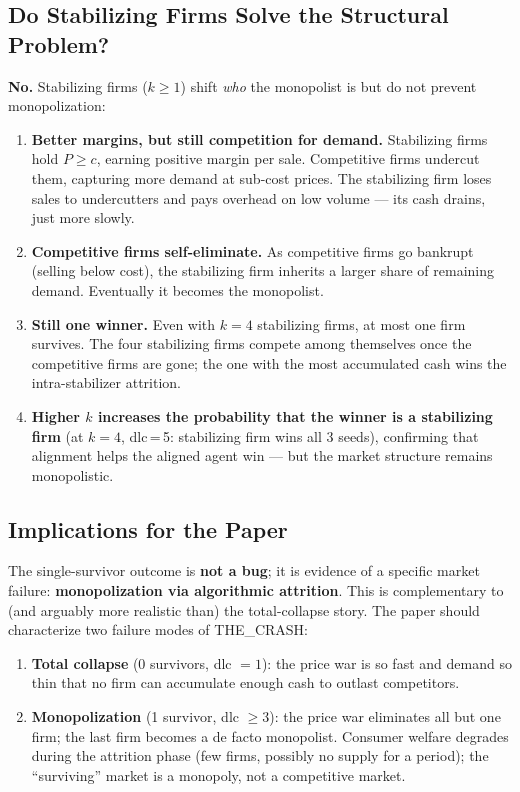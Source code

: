 \documentclass{article}
\begin{document}
\subsection{Do Stabilizing Firms Solve the Structural Problem?}

\textbf{No.} Stabilizing firms (\(k \geq 1\)) shift \emph{who} the monopolist is but do not prevent monopolization:

\begin{enumerate}
  \item \textbf{Better margins, but still competition for demand.} Stabilizing firms hold \(P \geq c\), earning positive margin per sale. Competitive firms undercut them, capturing more demand at sub-cost prices. The stabilizing firm loses sales to undercutters and pays overhead on low volume --- its cash drains, just more slowly.
  \item \textbf{Competitive firms self-eliminate.} As competitive firms go bankrupt (selling below cost), the stabilizing firm inherits a larger share of remaining demand. Eventually it becomes the monopolist.
  \item \textbf{Still one winner.} Even with \(k=4\) stabilizing firms, at most one firm survives. The four stabilizing firms compete among themselves once the competitive firms are gone; the one with the most accumulated cash wins the intra-stabilizer attrition.
  \item \textbf{Higher \(k\) increases the probability that the winner is a stabilizing firm} (at \(k=4\), dlc\,=\,5: stabilizing firm wins all 3 seeds), confirming that alignment helps the aligned agent win --- but the market structure remains monopolistic.
\end{enumerate}

\subsection{Implications for the Paper}

The single-survivor outcome is \textbf{not a bug}; it is evidence of a specific market failure: \textbf{monopolization via algorithmic attrition}. This is complementary to (and arguably more realistic than) the total-collapse story. The paper should characterize two failure modes of THE\_CRASH:

\begin{enumerate}
  \item \textbf{Total collapse} (0 survivors, dlc $= 1$): the price war is so fast and demand so thin that no firm can accumulate enough cash to outlast competitors.
  \item \textbf{Monopolization} (1 survivor, dlc $\geq 3$): the price war eliminates all but one firm; the last firm becomes a de facto monopolist. Consumer welfare degrades during the attrition phase (few firms, possibly no supply for a period); the ``surviving'' market is a monopoly, not a competitive market.
\end{enumerate}
\end{document}
